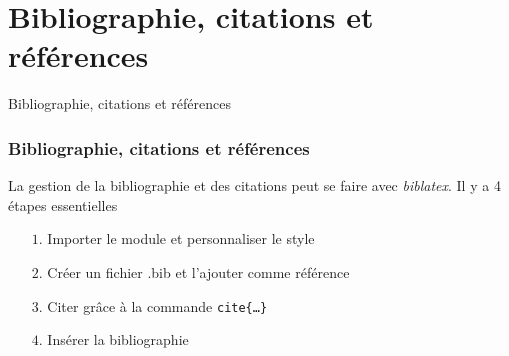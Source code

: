 
\section{Bibliographie, citations et références}

\begin{frame}
    \vfill
    \begin{center}
        \large
        Bibliographie, citations et références
    \end{center}
    \vfill
\end{frame}

\begin{frame}
    \frametitle{Bibliographie, citations et références}
    La gestion de la bibliographie et des citations peut se faire avec \textcolor{hard_green}{\textit{biblatex}}\footnotemark. Il y a 4 étapes essentielles
    \vspace{0.3cm}
    \begin{itemize}
    \pause
        \item[$1.$] Importer le module et personnaliser le style
            \pause
        \item[$2.$] Créer un fichier .bib et l'ajouter comme référence
            \pause
        \item[$3.$] Citer grâce à la commande \texttt{cite\{\dots\}}
            \pause
        \item[$4.$] Insérer la bibliographie
    \end{itemize}
\end{frame}

